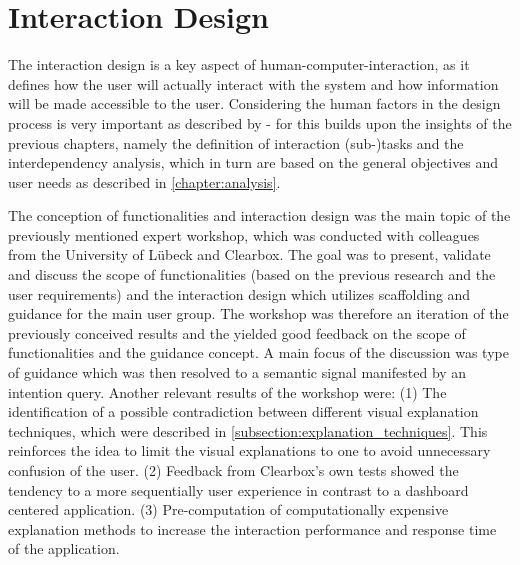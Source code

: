 \documentclass[11pt,a4paper,english]{scrreprt}
\begin{document}
\section{Interaction Design}\label{section:interaction_design}
The interaction design is a key aspect of human-computer-interaction, as it defines how the user will actually interact with the system and how information will be made accessible to the user. Considering the human factors in the design process is very important as described by \textcite{wickens_2016_engineering} - for this builds upon the insights of the previous chapters, namely the definition of interaction (sub-)tasks and the interdependency analysis, which in turn are based on the general objectives and user needs as described in \autoref{chapter:analysis}.

The conception of functionalities and interaction design was the main topic of the previously mentioned expert workshop, which was conducted with colleagues from the University of Lübeck and Clearbox. The goal was to present, validate and discuss the scope of functionalities (based on the previous research and the user requirements) and the interaction design which utilizes scaffolding and guidance for the main user group. The workshop was therefore an iteration of the previously conceived results and the yielded good feedback on the scope of functionalities and the guidance concept. A main focus of the discussion was type of guidance which was then resolved to a semantic signal manifested by an intention query. Another relevant results of the workshop were: (1) The identification of a possible contradiction between different visual explanation techniques, which were described in \autoref{subsection:explanation_techniques}. This reinforces the idea to limit the visual explanations to one to avoid unnecessary confusion of the user. (2) Feedback from Clearbox's own tests showed the tendency to a more sequentially user experience in contrast to a dashboard centered application. (3) Pre-computation of computationally expensive explanation methods to increase the interaction performance and response time of the application.
\end{document}
